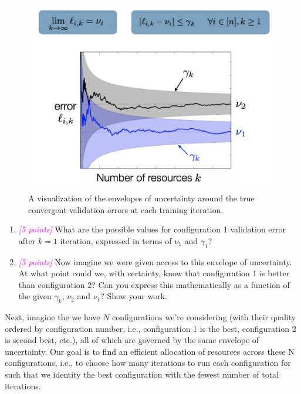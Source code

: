 \documentclass{exam}
\newcommand{\grade}[1]{\small\textcolor{magenta}{\emph{[#1 points]}} \normalsize}
\begin{document}
\begin{figure}[bh]
    \centering
    \includegraphics[width=.5\textwidth]{hw5/bands_of_uncertainty.png}
    \caption{A visualization of the envelopes of uncertainty around the true convergent validation errors at each training iteration.}
    \label{fig:bands}
\end{figure}

\begin{enumerate}[label=(\alph*)]

\item \grade{5} What are the possible values for configuration 1 validation error after $k=1$ iteration, expressed in terms of $\nu_1$ and $\gamma_1$?
    

\vspace{.5in}

\item \grade{5} Now imagine we were given access to this envelope of uncertainty. At what point could we, with certainty, know that configuration 1 is better than configuration 2? Can you express this mathematically as a function of the given $\gamma_k$, $\nu_2$ and $\nu_1$? Show your work. 
    
\vspace{0in}
\end{enumerate}


\clearpage
 Next, imagine the we have $N$ configurations we're considering (with their quality ordered by configuration number, i.e., configuration 1 is the best, configuration 2 is second best, etc.), all of which are governed by the same envelope of uncertainty. Our goal is to find an efficient allocation of resources across these N configurations, i.e., to choose how many iterations to run each configuration for such that we identity the best configuration with the fewest number of total iterations. 
\end{document}
